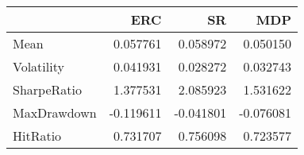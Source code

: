 \begin{tabular}{lrrr}
\toprule
{} &       ERC &        SR &       MDP \\
\midrule
Mean        &  0.057761 &  0.058972 &  0.050150 \\
Volatility  &  0.041931 &  0.028272 &  0.032743 \\
SharpeRatio &  1.377531 &  2.085923 &  1.531622 \\
MaxDrawdown & -0.119611 & -0.041801 & -0.076081 \\
HitRatio    &  0.731707 &  0.756098 &  0.723577 \\
\bottomrule
\end{tabular}

